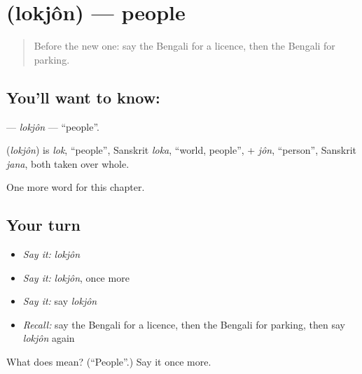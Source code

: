 \section[\texorpdfstring{\bn{লোকজন} (lokjôn)}{লোকজন (lokjôn)}]{ (lokjôn) — people}

\label{lesson:BN-C226-lokjon}



\begin{quote}
Before the new one: say the Bengali for a licence, then the Bengali for parking.
\end{quote}

\subsection*{You'll want to know: }
\textbf{} — \emph{lokjôn} — \textquotedblleft{}people\textquotedblright{}.

\begin{cousinweb}
\textbf{} (\emph{lokjôn}) is \emph{lok}, \textquotedblleft{}people\textquotedblright{}, Sanskrit \emph{loka}, \textquotedblleft{}world, people\textquotedblright{}, + \emph{jôn}, \textquotedblleft{}person\textquotedblright{}, Sanskrit \emph{jana}, both taken over whole.
\end{cousinweb}

\begin{grammarlens}[title={What you've built}]
One more word for this chapter.
\end{grammarlens}

\subsection*{Your turn}
\begin{itemize}
\raggedright
  \item \emph{Say it:} \emph{lokjôn}
  \item \emph{Say it:} \emph{lokjôn}, once more
  \item \emph{Say it:} say \emph{lokjôn}
  \item \emph{Recall:} say the Bengali for a licence, then the Bengali for parking, then say \emph{lokjôn} again
\end{itemize}

\begin{tcolorbox}[breakable,colback=teal!4,colframe=teal!35!black,title={Before you move on}]
What does  mean? (\textquotedblleft{}People\textquotedblright{}.) Say it once more.
\end{tcolorbox}
